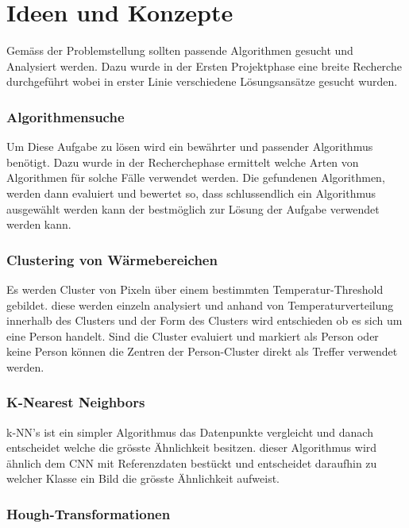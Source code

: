 \chapter{Ideen und Konzepte}

Gemäss der Problemstellung sollten passende Algorithmen gesucht und Analysiert werden. Dazu wurde in der Ersten Projektphase eine breite Recherche durchgeführt wobei in erster Linie verschiedene Lösungsansätze gesucht wurden.

\subsection{Algorithmensuche}

Um Diese Aufgabe zu lösen wird ein bewährter und passender Algorithmus benötigt. Dazu wurde in der Recherchephase ermittelt welche Arten von Algorithmen für solche Fälle verwendet werden. Die gefundenen Algorithmen, werden dann evaluiert und bewertet so, dass schlussendlich ein Algorithmus ausgewählt werden kann der bestmöglich zur Lösung der Aufgabe verwendet werden kann.

\subsection{Clustering von Wärmebereichen}

Es werden Cluster von Pixeln über einem bestimmten Temperatur-Threshold gebildet. diese werden einzeln analysiert und anhand von Temperaturverteilung innerhalb des Clusters und der Form des Clusters wird entschieden ob es sich um eine Person handelt. Sind die Cluster evaluiert und markiert als Person oder keine Person können die Zentren der Person-Cluster direkt als Treffer verwendet werden.


\subsection{K-Nearest Neighbors}

\gls{k-NN}'s ist ein simpler Algorithmus das Datenpunkte vergleicht und danach entscheidet welche die grösste Ähnlichkeit besitzen. dieser Algorithmus wird ähnlich dem \gls{CNN} mit Referenzdaten bestückt und entscheidet daraufhin zu welcher Klasse ein Bild die grösste Ähnlichkeit aufweist. 

\subsection{Hough-Transformationen}

